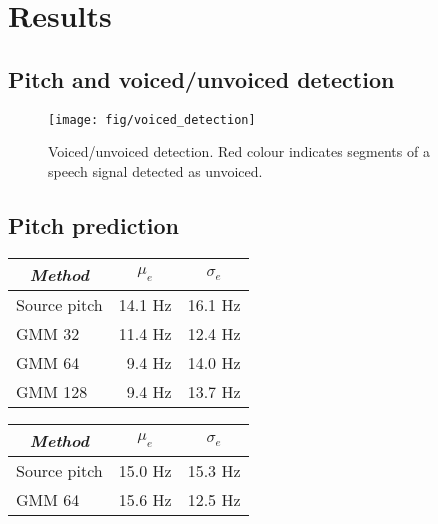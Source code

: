 \chapter{Results} %
\label{cha:results}

\section{Pitch and voiced/unvoiced detection} %
\label{sec:pitch_and_voiced_unvoiced_detection}
\begin{figure}[htbp]
	\begin{center}
		\texttt{[image: fig/voiced\_detection]}
		\caption{Voiced/unvoiced detection. Red colour indicates segments of a speech signal detected as unvoiced.}
		\label{fig:voiced_detection}
	\end{center}
\end{figure}


\section{Pitch prediction} %
\label{sec:pitch_prediction}

\begin{table}[htbp]
	\begin{center}
		\begin{tabular}{lrr}
			\toprule
			\multicolumn{1}{c}{\emph{Method}} & \multicolumn{1}{c}{$\mu_e$} & \multicolumn{1}{c}{$\sigma_e$}\\
			\midrule
			Source pitch & 14.1 Hz & 16.1 Hz\\
			GMM 32 & 11.4 Hz  & 12.4 Hz\\
			GMM 64 & 9.4 Hz  & 14.0 Hz\\
			GMM 128 & 9.4 Hz & 13.7 Hz\\
			\bottomrule			
		\end{tabular}		
	\end{center}
\label{tab:pitch_prediction_transformed}	
\end{table}

\begin{table}[htbp]
	\begin{center}
		\begin{tabular}{lrr}
			\toprule
			\multicolumn{1}{c}{\emph{Method}} & \multicolumn{1}{c}{$\mu_e$} & \multicolumn{1}{c}{$\sigma_e$}\\
			\midrule
			Source pitch & 15.0 Hz & 15.3 Hz\\
			GMM 64 & 15.6 Hz  & 12.5 Hz \\
			\bottomrule			
		\end{tabular}		
	\end{center}
\label{tab:pitch_prediction_unvoiced}	
\end{table}

